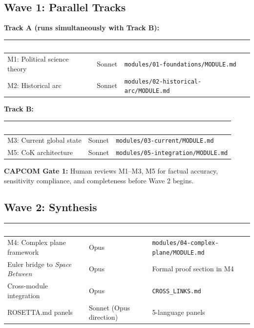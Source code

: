 \documentclass[11pt,letterpaper]{article}
\newcommand{\tableheader}[1]{\textbf{\sffamily\textcolor{white}{#1}}}
\begin{document}
\subsection{Wave 1: Parallel Tracks}

\textbf{Track A (runs simultaneously with Track B):}

\begin{center}
\begin{tabularx}{\textwidth}{L{3.5cm}L{2cm}X}
\toprule
{}
\tableheader{Task} & \tableheader{Agent} & \tableheader{Output} \\
\midrule
M1: Political science theory & Sonnet & \texttt{modules/01-foundations/MODULE.md} \\
M2: Historical arc & Sonnet & \texttt{modules/02-historical-arc/MODULE.md} \\
\bottomrule
\end{tabularx}
\end{center}

\textbf{Track B:}

\begin{center}
\begin{tabularx}{\textwidth}{L{3.5cm}L{2cm}X}
\toprule
{}
\tableheader{Task} & \tableheader{Agent} & \tableheader{Output} \\
\midrule
M3: Current global state & Sonnet & \texttt{modules/03-current/MODULE.md} \\
M5: CoK architecture & Sonnet & \texttt{modules/05-integration/MODULE.md} \\
\bottomrule
\end{tabularx}
\end{center}

\textbf{CAPCOM Gate 1:} Human reviews M1--M3, M5 for factual accuracy, sensitivity compliance, and completeness before Wave 2 begins.

\subsection{Wave 2: Synthesis}

\begin{center}
\begin{tabularx}{\textwidth}{L{4cm}L{2cm}X}
\toprule
{}
\tableheader{Task} & \tableheader{Agent} & \tableheader{Output} \\
\midrule
M4: Complex plane framework & Opus & \texttt{modules/04-complex-plane/MODULE.md} \\
Euler bridge to \textit{Space Between} & Opus & Formal proof section in M4 \\
Cross-module integration & Opus & \texttt{CROSS\_LINKS.md} \\
ROSETTA.md panels & Sonnet (Opus direction) & 5-language panels \\
\bottomrule
\end{tabularx}
\end{center}
\end{document}
